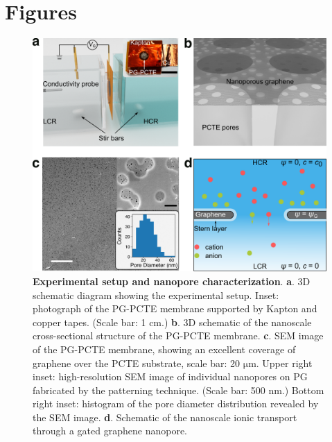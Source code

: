 \documentclass[journal=nalefd,email=true, hyperref=true, keywords=false]{achemso}
\begin{document}
\section*{}
\label{sec:ref}



\clearpage
\section{Figures}
\label{sec:figs}

\begin{figure}[H]
  \centering
  \includegraphics[width=0.95\linewidth]{img/fig1.pdf}
  \caption{\textbf{Experimental setup and nanopore characterization}.
    \textbf{a}. 3D schematic diagram showing the experimental
    setup. Inset: photograph of the PG-PCTE membrane supported by
    Kapton and copper tapes. (Scale bar: 1 cm.) \textbf{b}. 3D schematic
    of the nanoscale cross-sectional structure of the PG-PCTE
    membrane. \textbf{c}. SEM image of the PG-PCTE membrane, showing an
    excellent coverage of graphene over the PCTE substrate, scale bar:
    20 $\mathrm{\mu}$m.  Upper right inset: high-resolution SEM image
    of individual nanopores on PG fabricated by the patterning
    technique. (Scale bar: 500 nm.) Bottom right inset: histogram of the
    pore diameter distribution revealed by the SEM
    image. \textbf{d}. Schematic of the nanoscale ionic transport
    through a gated graphene nanopore.}
  \label{fig:1}
\end{figure}
\end{document}
